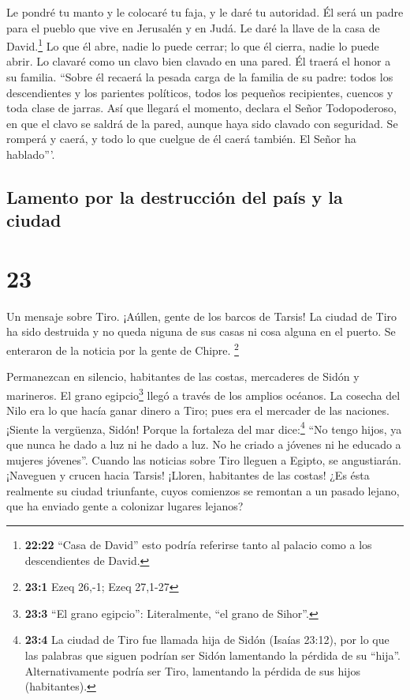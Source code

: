  Le pondré tu manto y le colocaré tu faja, y le daré tu
autoridad. Él será un padre para el pueblo que vive en Jerusalén y en
Judá.  Le daré la llave de la casa de David.\footnote{\textbf{22:22}
  ``Casa de David'' esto podría referirse tanto al palacio como a los
  descendientes de David.} Lo que él abre, nadie lo puede cerrar; lo que
él cierra, nadie lo puede abrir.  Lo clavaré como un
clavo bien clavado en una pared. Él traerá el honor a su familia.
 ``Sobre él recaerá la pesada carga de la familia de su
padre: todos los descendientes y los parientes políticos, todos los
pequeños recipientes, cuencos y toda clase de jarras. 
Así que llegará el momento, declara el Señor Todopoderoso, en que el
clavo se saldrá de la pared, aunque haya sido clavado con seguridad. Se
romperá y caerá, y todo lo que cuelgue de él caerá también. El Señor ha
hablado'''.

\hypertarget{lamento-por-la-destrucciuxf3n-del-pauxeds-y-la-ciudad}{%
\subsection{Lamento por la destrucción del país y la
ciudad}\label{lamento-por-la-destrucciuxf3n-del-pauxeds-y-la-ciudad}}

\hypertarget{section-22}{%
\section{23}\label{section-22}}

 Un mensaje sobre Tiro. ¡Aúllen, gente de los barcos de
Tarsis! La ciudad de Tiro ha sido destruida y no queda niguna de sus
casas ni cosa alguna en el puerto. Se enteraron de la noticia por la
gente de Chipre. \footnote{\textbf{23:1} Ezeq 26,-1; Ezeq 27,1-27}

 Permanezcan en silencio, habitantes de las costas,
mercaderes de Sidón y marineros.  El grano
egipcio\footnote{\textbf{23:3} ``El grano egipcio'': Literalmente, ``el
  grano de Sihor''.} llegó a través de los amplios océanos. La cosecha
del Nilo era lo que hacía ganar dinero a Tiro; pues era el mercader de
las naciones.  ¡Siente la vergüenza, Sidón! Porque la
fortaleza del mar dice:\footnote{\textbf{23:4} La ciudad de Tiro fue
  llamada hija de Sidón (Isaías 23:12), por lo que las palabras que
  siguen podrían ser Sidón lamentando la pérdida de su ``hija''.
  Alternativamente podría ser Tiro, lamentando la pérdida de sus hijos
  (habitantes).} ``No tengo hijos, ya que nunca he dado a luz ni he dado
a luz. No he criado a jóvenes ni he educado a mujeres jóvenes''.
 Cuando las noticias sobre Tiro lleguen a Egipto, se
angustiarán.  ¡Naveguen y crucen hacia Tarsis! ¡Lloren,
habitantes de las costas!  ¿Es ésta realmente su ciudad
triunfante, cuyos comienzos se remontan a un pasado lejano, que ha
enviado gente a colonizar lugares lejanos?

